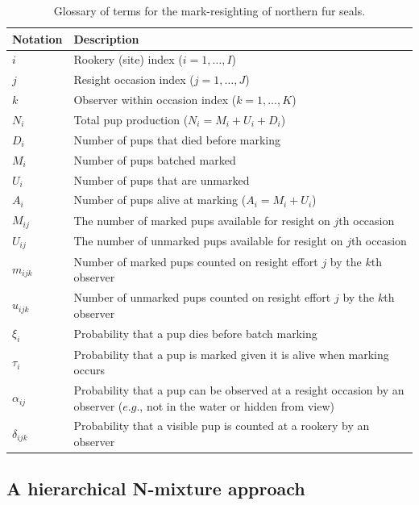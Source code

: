 \documentclass[fleqn,10pt]{wlscirep}
\begin{document}
{\begin{table}

\caption{\label{tab:notation}Glossary of terms for the mark-resighting of northern fur seals.}
\centering
\begin{tabular}[t]{l>{\raggedright\arraybackslash}p{10cm}}
\toprule
Notation & Description\\
\midrule
$i$ & Rookery (site) index ($i=1,\dots,I$)\\
$j$ & Resight occasion index ($j=1,\dots,J$)\\
$k$ & Observer within occasion index ($k=1,\dots,K$)\\
$N_i$ & Total pup production ($N_i = M_i + U_i + D_i$)\\
$D_i$ & Number of pups that died before marking\\
\addlinespace
$M_i$ & Number of pups batched marked\\
$U_i$ & Number of pups that are unmarked\\
$A_i$ & Number of pups alive at marking ($A_i = M_i+U_i$)\\
$M_{ij}$ & The number of marked pups available for resight on $j$th occasion\\
$U_{ij}$ & The number of unmarked pups available for resight on $j$th occasion\\
\addlinespace
$m_{ijk}$ & Number of marked pups counted on resight effort $j$ by the $k$th observer\\
$u_{ijk}$ & Number of unmarked pups counted on resight effort $j$ by the $k$th observer\\
$\xi_i$ & Probability that a pup dies before batch marking\\
$\tau_i$ & Probability that a pup is marked given it is alive when marking occurs\\
$\alpha_{ij}$ & Probability that a pup can be observed at a resight occasion by an observer ($e.g.$, not in the water or hidden from view)\\
\addlinespace
$\delta_{ijk}$ & Probability that a visible pup is counted at a rookery by an observer\\
\bottomrule
\end{tabular}
\end{table}

\hypertarget{a-hierarchical-n-mixture-approach}{%
\subsection{A hierarchical N-mixture approach}\label{a-hierarchical-n-mixture-approach}}

}
\end{document}
